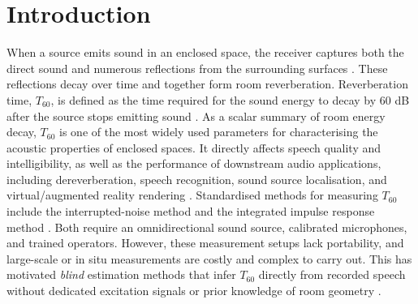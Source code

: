 \documentclass[a4paper,fleqn]{cas-sc}
\begin{document}
\maketitle


\section{Introduction}
\label{sec:introduction}



When a source emits sound in an enclosed space, the receiver captures both the direct sound and numerous reflections from the surrounding surfaces \citep{kuttruff2013room}. These reflections decay over time and together form room reverberation. Reverberation time, $T_{60}$, is defined as the time required for the sound energy to decay by 60 dB after the source stops emitting sound \citep{iso3382_2_2008}. As a scalar summary of room energy decay, $T_{60}$ is one of the most widely used parameters for characterising the acoustic properties of enclosed spaces. It directly affects speech quality and intelligibility, as well as the performance of downstream audio applications, including dereverberation, speech recognition, sound source localisation, and virtual/augmented reality rendering \citep{benzeghiba2007asrreview,anthes2016vr}. Standardised methods for measuring $T_{60}$ include the interrupted-noise method and the integrated impulse response method \citep{schroeder1965rt}. Both require an omnidirectional sound source, calibrated microphones, and trained operators. However, these measurement setups lack portability, and large-scale or in situ measurements are costly and complex to carry out. This has motivated \emph{blind} estimation methods that infer $T_{60}$ directly from recorded speech without dedicated excitation signals or prior knowledge of room geometry \citep{eaton2016ace}.


\end{document}
